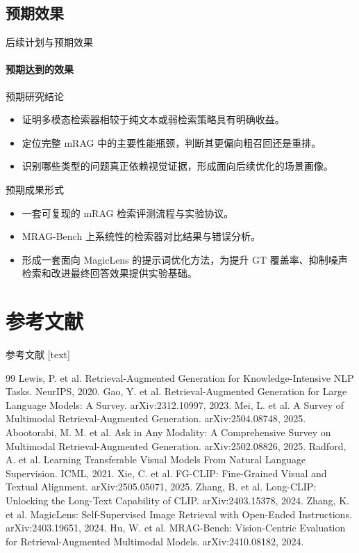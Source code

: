 \documentclass[10pt,aspectratio=169,]{beamer}
\begin{document}
\subsection{预期效果}
\begin{frame}{后续计划与预期效果}
	\framesubtitle{预期达到的效果}
	\begin{block}{预期研究结论}
		\begin{itemize}
			\item 证明多模态检索器相较于纯文本或弱检索策略具有明确收益。
			\item 定位完整 mRAG 中的主要性能瓶颈，判断其更偏向粗召回还是重排。
			\item 识别哪些类型的问题真正依赖视觉证据，形成面向后续优化的场景画像。
		\end{itemize}
	\end{block}
	\begin{alertblock}{预期成果形式}
		\begin{itemize}
			\item 一套可复现的 mRAG 检索评测流程与实验协议。
			\item MRAG-Bench 上系统性的检索器对比结果与错误分析。
			\item 形成一套面向 MagicLens 的提示词优化方法，为提升 GT 覆盖率、抑制噪声检索和改进最终回答效果提供实验基础。
		\end{itemize}
	\end{alertblock}
\end{frame}

\section{参考文献}
\begin{frame}[allowframebreaks]{参考文献}
	\scriptsize
	[text]
	\begin{thebibliography}{99}
		Lewis, P. et al. Retrieval-Augmented Generation for Knowledge-Intensive NLP Tasks. NeurIPS, 2020.
		Gao, Y. et al. Retrieval-Augmented Generation for Large Language Models: A Survey. arXiv:2312.10997, 2023.
		Mei, L. et al. A Survey of Multimodal Retrieval-Augmented Generation. arXiv:2504.08748, 2025.
		Abootorabi, M. M. et al. Ask in Any Modality: A Comprehensive Survey on Multimodal Retrieval-Augmented Generation. arXiv:2502.08826, 2025.
		Radford, A. et al. Learning Transferable Visual Models From Natural Language Supervision. ICML, 2021.
		Xie, C. et al. FG-CLIP: Fine-Grained Visual and Textual Alignment. arXiv:2505.05071, 2025.
		Zhang, B. et al. Long-CLIP: Unlocking the Long-Text Capability of CLIP. arXiv:2403.15378, 2024.
		Zhang, K. et al. MagicLens: Self-Supervised Image Retrieval with Open-Ended Instructions. arXiv:2403.19651, 2024.
		Hu, W. et al. MRAG-Bench: Vision-Centric Evaluation for Retrieval-Augmented Multimodal Models. arXiv:2410.08182, 2024.
	\end{thebibliography}
\end{frame}
\end{document}
